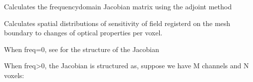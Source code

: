 \documentclass[letterpaper,10pt,english]{sphinxmanual}
\begin{document}
\begin{fulllineitems}
\label{\detokenize{_autosummary/nirfasterff.inverse.jacobian_stnd_FD:nirfasterff.inverse.jacobian_stnd_FD}}
\pysigstartsignatures
{}
\pysigstopsignatures
\sphinxAtStartPar
Calculates the frequency\sphinxhyphen{}domain Jacobian matrix using the adjoint method

\sphinxAtStartPar
Calculates spatial distributions of sensitivity of field registerd on the mesh boundary to changes of optical properties per voxel.

\sphinxAtStartPar
When freq=0, see {\hyperref[\detokenize{_autosummary/nirfasterff.inverse.jacobian_stnd_CW:nirfasterff.inverse.jacobian_stnd_CW}]{}} for the structure of the Jacobian

\sphinxAtStartPar
When freq\textgreater{}0, the Jacobian is structured as, suppose we have M channels and N voxels:


\end{fulllineitems}
\end{document}
